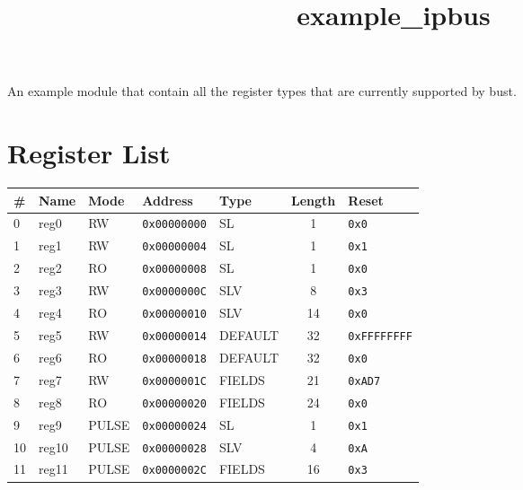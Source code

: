 \documentclass{article}
\title{example{\_}ipbus}
\author{}
\date{}
\begin{document}
\maketitle

An example module that contain all the register types that are currently supported by bust.

\section{Register List}

\begin{table}[h!]
  \begin{center}
    \label{tab:table1}
    \begin{tabularx}{\linewidth}{|l|X|l|l|l|c|l|}
      \hline
      \textbf{\#} & \textbf{Name} & \textbf{Mode} & \textbf{Address} & \textbf{Type} & \textbf{Length} &
      \textbf{Reset} \\
      \hline
      0 & reg0 & RW & \texttt{0x00000000} & SL & 1 & \texttt{0x0} \\
      \hline
      1 & reg1 & RW & \texttt{0x00000004} & SL & 1 & \texttt{0x1} \\
      \hline
      2 & reg2 & RO & \texttt{0x00000008} & SL & 1 & \texttt{0x0} \\
      \hline
      3 & reg3 & RW & \texttt{0x0000000C} & SLV & 8 & \texttt{0x3} \\
      \hline
      4 & reg4 & RO & \texttt{0x00000010} & SLV & 14 & \texttt{0x0} \\
      \hline
      5 & reg5 & RW & \texttt{0x00000014} & DEFAULT & 32 & \texttt{0xFFFFFFFF} \\
      \hline
      6 & reg6 & RO & \texttt{0x00000018} & DEFAULT & 32 & \texttt{0x0} \\
      \hline
      7 & reg7 & RW & \texttt{0x0000001C} & FIELDS & 21 & \texttt{0xAD7} \\
      \hline
      8 & reg8 & RO & \texttt{0x00000020} & FIELDS & 24 & \texttt{0x0} \\
      \hline
      9 & reg9 & PULSE & \texttt{0x00000024} & SL & 1 & \texttt{0x1} \\
      \hline
      10 & reg10 & PULSE & \texttt{0x00000028} & SLV & 4 & \texttt{0xA} \\
      \hline
      11 & reg11 & PULSE & \texttt{0x0000002C} & FIELDS & 16 & \texttt{0x3} \\
      \hline
    \end{tabularx}
  \end{center}
\end{table}
\end{document}
